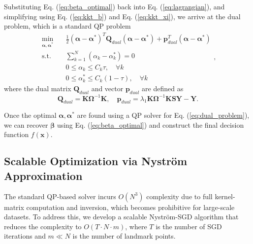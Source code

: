 \documentclass[a4paper]{cas-sc}
\begin{document}
Substituting Eq. (\ref{eq:beta_optimal}) back into Eq. (\ref{eq:lagrangian}), and simplifying using Eq. (\ref{eq:kkt_b}) and Eq. (\ref{eq:kkt_xi}), we arrive at the dual problem, which is a standard QP problem
\begin{equation}
\label{eq:dual_problem}
\begin{aligned}
\min_{\boldsymbol{\alpha}, \boldsymbol{\alpha}^*} \quad & \frac{1}{2} (\boldsymbol{\alpha} - \boldsymbol{\alpha}^*)^T \mathbf{Q}_{dual} (\boldsymbol{\alpha} - \boldsymbol{\alpha}^*) + \mathbf{p}_{dual}^T (\boldsymbol{\alpha} - \boldsymbol{\alpha}^*) \\
\text{s.t.} \quad & \sum_{k=1}^N (\alpha_k - \alpha_k^*) = 0 \\
& 0 \le \alpha_k \le C_k \tau, \quad \forall k \\
& 0 \le \alpha_k^* \le C_k (1-\tau), \quad \forall k
\end{aligned},
\end{equation}
where the dual matrix $\mathbf{Q}_{dual}$ and vector $\mathbf{p}_{dual}$ are defined as
\begin{equation}
\label{eq:dual_matrices}
\mathbf{Q}_{dual} = \boldsymbol{K} \boldsymbol{\Omega}^{-1} \boldsymbol{K}, \quad \mathbf{p}_{dual} = \lambda_1 \boldsymbol{K} \boldsymbol{\Omega}^{-1} \boldsymbol{K} \mathbf{S} \boldsymbol{Y} - \boldsymbol{Y}.
\end{equation}

Once the optimal $\boldsymbol{\alpha}, \boldsymbol{\alpha}^*$ are found using a QP solver for Eq. (\ref{eq:dual_problem}), we can recover $\boldsymbol{\beta}$ using Eq. (\ref{eq:beta_optimal}) and construct the final decision function $f(\boldsymbol{x})$.


\subsection{Scalable Optimization via Nystr\"{o}m Approximation}\label{fast_alg}
The standard QP-based solver incurs $O(N^3)$ complexity due to full kernel-matrix computation and inversion, which becomes prohibitive for large-scale datasets. To address this, we develop a scalable Nystr\"{o}m-SGD algorithm that reduces the complexity to $O(T \cdot N \cdot m)$, where $T$ is the number of SGD iterations and $m \ll N$ is the number of landmark points.
\end{document}
